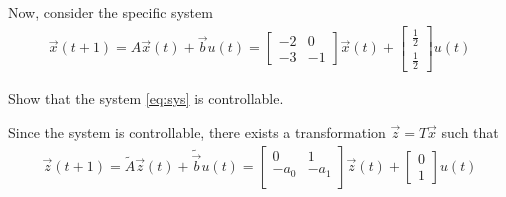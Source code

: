 
Now, consider the specific system
\begin{align} \label{eq:sys}
\vec{x}(t+1) = A \vec{x}(t) + \vec{b} u(t) = \begin{bmatrix}
-2 & 0 \\
-3 & -1
\end{bmatrix} \vec{x}(t) + 
\begin{bmatrix}
\frac{1}{2} \\
\frac{1}{2}
\end{bmatrix} u(t)
\end{align}

\begin{enumerate}
\qitem Show that the system \eqref{eq:sys} is controllable.

\end{enumerate}

Since the system is controllable,
there exists a transformation $\vec{z} = T\vec{x}$ such that
\begin{align} \label{eq:canonical}
\vec{z}(t+1) = \widetilde{A}\vec{z}(t) + \widetilde{\vec{b}} u(t) = \begin{bmatrix}
0 & 1  \\
 -a_0 & -a_1 \\
\end{bmatrix} 
\vec{z}(t) +
\begin{bmatrix}
0  \\ 1
\end{bmatrix}
u(t)
\end{align}

